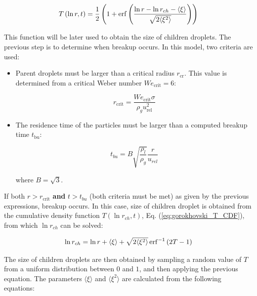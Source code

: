 \begin{equation}
\label{eq:gorokhovski_T_CDF}
T \left( \ln r, t \right) = \frac{1}{2} \left( 1 + \operatorname{erf} \left( \frac{\ln r - \ln r_{ch} - \langle \xi \rangle }{\sqrt{2 \langle \xi^2 \rangle}}\right)  \right)
\end{equation}

This function will be later used to obtain the size of children droplets. The previous step is to determine when breakup occurs. In this model, two criteria are used:

\begin{itemize}

	\item Parent droplets must be larger than a critical radius $r_\mathrm{cr}$. This value is determined from a critical Weber number $We_\mathrm{crit} = 6$:
	
	\begin{equation}
	r_\mathrm{crit} = \frac{We_\mathrm{crit} \sigma}{\rho_g u_\mathrm{rel}^2}
	\end{equation}
	
	\item The residence time of the particles must be larger than a computed breakup time $t_\mathrm{bu}$:
	
	\begin{equation}
	t_{bu} = B \sqrt{\frac{\rho_l}{\rho_g}} \frac{r}{u_{rel}}
	\end{equation}
	
	where $B = \sqrt{3}$.

\end{itemize}

If both $r > r_\mathrm{crit}$ \textbf{and} $t > t_{bu}$ (both criteria must be met) as given by the previous expressions, breakup occurs. In this case, size of children droplet is obtained from the cumulative density function $T \left( \ln r_{ch}, t \right)$, Eq. (\ref{eq:gorokhovski_T_CDF}), from which $\ln r_{ch}$ can be solved:
 
 
\begin{equation}
\ln r_{ch} = \ln r + \langle \xi \rangle  + \sqrt{2 \langle \xi^2 \rangle} \operatorname{erf}^{-1} \left(  2 T - 1 \right)
\end{equation}

The size of children droplets are then obtained by sampling a random value of $T$ from a uniform distribution between $0$ and $1$, and then applying the previous equation. The parameters $\langle \xi \rangle$ and $\langle \xi^2 \rangle$ are calculated from the following equations:

